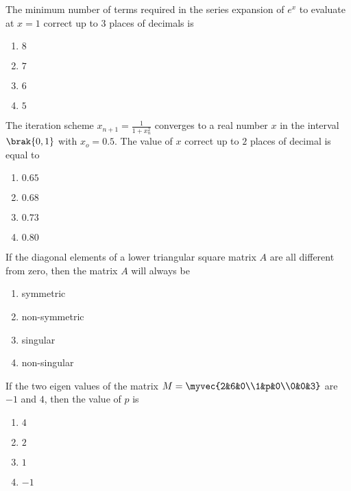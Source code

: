 \iffalse
	\title{2007-XE-35-51}
	\author{EE24Btech11006 - Arnav Mahishi}
	\section{xe}
	\chapter{2007}
\fi
\item{
The minimum number of terms required in the series expansion of $e^x$ to evaluate at $x=1$ correct up to $3$ places of decimals is
\begin{multicols}{4}
\begin{enumerate}
\item$8$
\item$7$
\item$6$
\item$5$
\end{enumerate}
\end{multicols}
}
\item{
The iteration scheme $x_{n+1}=\frac{1}{1+x_n^2}$ converges to a real number $x$ in the interval $\brak{0,1}$ with $x_o=0.5$. The value of $x$ correct up to $2$ places of decimal is equal to
\begin{multicols}{4}
\begin{enumerate}
\item $0.65$
\item $0.68$
\item $0.73$
\item $0.80$
\end{enumerate}
\end{multicols}}
\item{
If the diagonal elements of a lower triangular square matrix $A$ are all different from zero, then the matrix $A$  will always be 
\begin{multicols}{4}
\begin{enumerate}
\item symmetric
\item non-symmetric
\item singular
\item non-singular
\end{enumerate}
\end{multicols}
}
\item{
If the two eigen values of the matrix $M=\myvec{2&6&0\\1&p&0\\0&0&3}$ are $-1$ and $4$, then the value of $p$ is 
\begin{multicols}{4}
\begin{enumerate}
\item $4$
\item $2$
\item $1$
\item $-1$
\end{enumerate}
\end{multicols}
}
